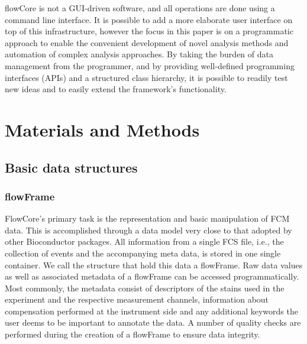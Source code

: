 \documentclass[12pt]{article}
\begin{document}
flowCore is not a GUI-driven software, and all operations are done
using a command line interface.  It is possible to add a more
elaborate user interface on top of this infrastructure, however the
focus in this paper is on a programmatic approach to enable the
convenient development of novel analysis methods and automation of
complex analysis approaches.  By taking the burden of data management
from the programmer, and by providing well-defined programming
interfaces (APIs) and a structured class hierarchy, it is possible to
readily test new ideas and to easily extend the framework's
functionality.



\section*{Materials and Methods}
\subsection*{Basic data structures}
\subsubsection*{flowFrame}

FlowCore's primary task is the representation and basic manipulation
of FCM data. This is accomplished through a data model very close to
that adopted by other Bioconductor packages. All information from a
single FCS file, i.e., the collection of events and the accompanying
meta data, is stored in one single container. We call the structure
that hold this data a flowFrame. Raw data values as well as associated
metadata of a flowFrame can be accessed programmatically. Most
commonly, the metadata consist of descriptors of the stains used in
the experiment and the respective measurement channels, information
about compensation performed at the instrument side and any additional
keywords the user deems to be important to annotate the data. A number
of quality checks are performed during the creation of a flowFrame to
ensure data integrity.

\end{document}

